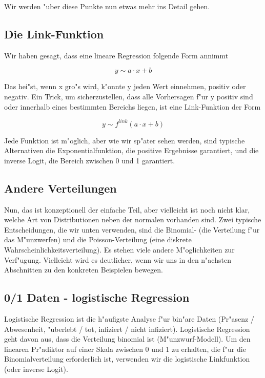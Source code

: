 \documentclass[a4paper,twoside]{tufte-book}\usepackage[]{graphicx}\usepackage[]{color}
\begin{document}
Wir werden "uber diese Punkte nun etwas mehr ins Detail gehen.

\subsection{Die Link-Funktion}

Wir haben gesagt, dass eine lineare Regression folgende Form annimmt

\begin{equation}
y \sim a \cdot x + b 
\end{equation}

Das hei"st, wenn x gro"s wird, k"onnte y jeden Wert einnehmen, positiv oder negativ. Ein Trick, um sicherzustellen, dass alle Vorhersagen f"ur y positiv sind oder innerhalb eines bestimmten Bereichs liegen, ist eine Link-Funktion der Form

\begin{equation}
y \sim f^{link}(a \cdot x + b )
\end{equation}

Jede Funktion ist m"oglich, aber wie wir sp"ater sehen werden, sind typische Alternativen die Exponentialfunktion, die positive Ergebnisse garantiert, und die inverse Logit, die Bereich zwischen 0 und 1 garantiert.

\subsection{Andere Verteilungen}

Nun, das ist konzeptionell der einfache Teil, aber vielleicht ist noch nicht klar, welche Art von Distributionen neben der normalen vorhanden sind. Zwei typische Entscheidungen, die wir unten verwenden, sind die Binomial- (die Verteilung f"ur das M"unzwerfen) und die Poisson-Verteilung (eine diskrete Wahrscheinlichkeitsverteilung). Es stehen viele andere M"oglichkeiten zur Verf"ugung. Vielleicht wird es deutlicher, wenn wir uns in den n"achsten Abschnitten zu den konkreten Beispielen bewegen.

\subsection{0/1 Daten - logistische Regression}

Logistische Regression ist die h"aufigste Analyse f"ur bin"are Daten (Pr"asenz / Abwesenheit, "uberlebt / tot, infiziert / nicht infiziert). Logistische Regression geht davon aus, dass die Verteilung binomial ist (M"unzwurf-Modell). Um den linearen Pr"adiktor auf einer Skala zwischen 0 und 1 zu erhalten, die f"ur die Binomialverteilung erforderlich ist, verwenden wir die logistische Linkfunktion (oder inverse Logit).
\end{document}
